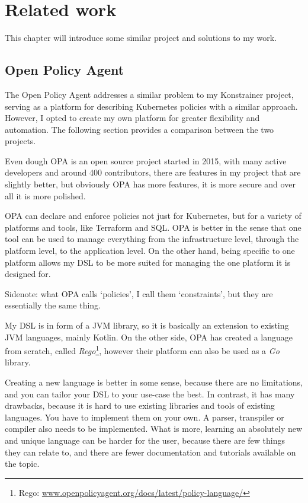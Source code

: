 \setlength{\parindent}{0pt}
\setlength{\parskip}{0.6em}

\chapter{Related work}
\label{chap:relatedWorks}

This chapter will introduce some similar project and solutions to my work.

\section{Open Policy Agent}

The Open Policy Agent addresses a similar problem to my Konstrainer project, serving as a platform for describing Kubernetes policies with a similar approach. However, I opted to create my own platform for greater flexibility and automation. The following section provides a comparison between the two projects.

Even dough OPA is an open source project started in 2015, with many active developers and around 400 contributors, there are features in my project that are slightly better, but obviously OPA has more features, it is more secure and over all it is more polished.

OPA can declare and enforce policies not just for Kubernetes, but for a variety of platforms and tools, like Terraform and SQL. OPA is better in the sense that one tool can be used to manage everything from the infrastructure level, through the platform level, to the application level. On the other hand, being specific to one platform allows my DSL to be more suited for managing the one platform it is designed for.

Sidenote: what OPA calls `policies', I call them `constraints', but they are essentially the same thing.

My DSL is in form of a JVM library, so it is basically an extension to existing JVM languages, mainly Kotlin. On the other side, OPA has created a language from scratch, called \emph{Rego}\footnote{Rego: \url{www.openpolicyagent.org/docs/latest/policy-language/}}, however their platform can also be used as a \emph{Go} library. 

Creating a new language is better in some sense, because there are no limitations, and you can tailor your DSL to your use-case the best. In contrast, it has many drawbacks, because it is hard to use existing libraries and tools of existing languages. You have to implement them on your own. A parser, transpiler or compiler also needs to be implemented. What is more, learning an absolutely new and unique language can be harder for the user, because there are few things they can relate to, and there are fewer documentation and tutorials available on the topic.

